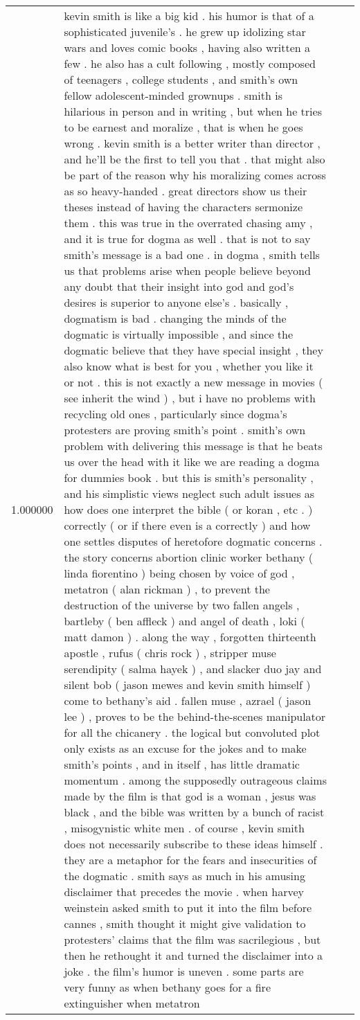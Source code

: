 \begin{tabular}{r{1cm} p{0.4in} r{1cm} p{0.4in}}
1.000000 & kevin smith is like a big kid .  his humor is that of a sophisticated juvenile's .  he grew up idolizing star wars and loves comic books , having also written a few .  he also has a cult following , mostly composed of teenagers , college students , and smith's own fellow adolescent-minded grownups .  smith is hilarious in person and in writing , but when he tries to be earnest and moralize , that is when he goes wrong .  kevin smith is a better writer than director , and he'll be the first to tell you that .  that might also be part of the reason why his moralizing comes across as so heavy-handed .  great directors show us their theses instead of having the characters sermonize them .  this was true in the overrated chasing amy , and it is true for dogma as well .  that is not to say smith's message is a bad one .  in dogma , smith tells us that problems arise when people believe beyond any doubt that their insight into god and god's desires is superior to anyone else's .  basically , dogmatism is bad .  changing the minds of the dogmatic is virtually impossible , and since the dogmatic believe that they have special insight , they also know what is best for you , whether you like it or not .  this is not exactly a new message in movies ( see inherit the wind ) , but i have no problems with recycling old ones , particularly since dogma's protesters are proving smith's point .  smith's own problem with delivering this message is that he beats us over the head with it like we are reading a dogma for dummies book .  but this is smith's personality , and his simplistic views neglect such adult issues as how does one interpret the bible ( or koran , etc . ) correctly ( or if there even is a correctly ) and how one settles disputes of heretofore dogmatic concerns .  the story concerns abortion clinic worker bethany ( linda fiorentino ) being chosen by voice of god , metatron ( alan rickman ) , to prevent the destruction of the universe by two fallen angels , bartleby ( ben affleck ) and angel of death , loki ( matt damon ) .  along the way , forgotten thirteenth apostle , rufus ( chris rock ) , stripper muse serendipity ( salma hayek ) , and slacker duo jay and silent bob ( jason mewes and kevin smith himself ) come to bethany's aid .  fallen muse , azrael ( jason lee ) , proves to be the behind-the-scenes manipulator for all the chicanery .  the logical but convoluted plot only exists as an excuse for the jokes and to make smith's points , and in itself , has little dramatic momentum .  among the supposedly outrageous claims made by the film is that god is a woman , jesus was black , and the bible was written by a bunch of racist , misogynistic white men .  of course , kevin smith does not necessarily subscribe to these ideas himself .  they are a metaphor for the fears and insecurities of the dogmatic .  smith says as much in his amusing disclaimer that precedes the movie .  when harvey weinstein asked smith to put it into the film before cannes , smith thought it might give validation to protesters' claims that the film was sacrilegious , but then he rethought it and turned the disclaimer into a joke .  the film's humor is uneven .  some parts are very funny as when bethany goes for a fire extinguisher when metatron 
\end{tabular}
